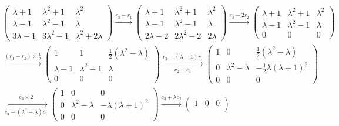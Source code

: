 \documentclass[12pt, a4paper, oneside, UTF8]{ctexbook}
\begin{document}
\begin{solution}
    \begin{align*}
        &\begin{pmatrix}
            \lambda+1 & \lambda^2+1 &\lambda^2 \\
            \lambda-1 & \lambda^2-1 & \lambda \\
            3\lambda-1 & 3\lambda^2-1 & \lambda^2+2\lambda 
        \end{pmatrix} \xrightarrow{r_3-r_1}
        \begin{pmatrix}
            \lambda+1 & \lambda^2+1 &\lambda^2  \\
            \lambda-1 & \lambda^2-1 & \lambda \\
            2\lambda-2 & 2\lambda^2-2 & 2\lambda 
        \end{pmatrix}\xrightarrow{r_3-2r_2}
        \begin{pmatrix}
            \lambda+1 & \lambda^2+1 &\lambda^2 \\
            \lambda-1 & \lambda^2-1 & \lambda \\
            0 & 0& 0
        \end{pmatrix} \\
        &\xrightarrow{(r_1-r_2)\times \frac{1}{2}}
        \begin{pmatrix}
            1 & 1 &\frac{1}{2}(\lambda^2-\lambda) \\
            \lambda-1 & \lambda^2-1 & \lambda \\
            0 & 0& 0 
        \end{pmatrix}
        \xrightarrow[c_2-c_1]{r_2-(\lambda-1) r_1}
        \begin{pmatrix}
            1 & 0 &\frac{1}{2}(\lambda^2-\lambda) \\
            0 & \lambda^2-\lambda & -\frac{1}{2}\lambda(\lambda+1)^2 \\
            0 & 0& 0 
        \end{pmatrix}\\
        &\xrightarrow[c_3-(\lambda^2-\lambda) c_1]{c_3\times 2}
        \begin{pmatrix}
            1 & 0 &0 \\
            0 & \lambda^2-\lambda & -\lambda(\lambda+1)^2 \\
            0 & 0& 0 
        \end{pmatrix} 
        \xrightarrow{c_3+\lambda c_2}
        \begin{pmatrix}
            1 & 0 &0 \\

\end{pmatrix}
\end{align*}
\end{solution}
\end{document}
